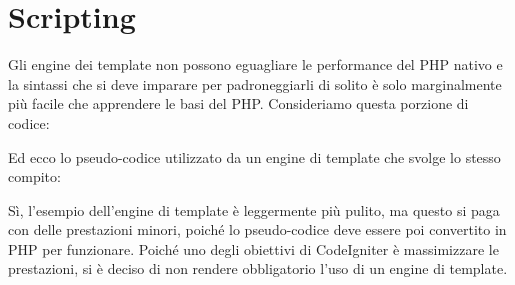\section{Scripting}
\label{cap:script}

Gli engine dei template non possono eguagliare le performance del \ac{PHP} nativo e la sintassi che si deve imparare per padroneggiarli di solito è solo marginalmente più facile che apprendere le basi del \ac{PHP}. Consideriamo questa porzione di codice:


Ed ecco lo pseudo-codice utilizzato da un engine di template che svolge lo stesso compito:


Sì, l'esempio dell'engine di template è leggermente più pulito, ma questo si paga con delle prestazioni minori, poiché lo pseudo-codice deve essere poi convertito in \ac{PHP} per funzionare. Poiché uno degli obiettivi di CodeIgniter è massimizzare le prestazioni, si è deciso di non rendere obbligatorio l'uso di un engine di template.